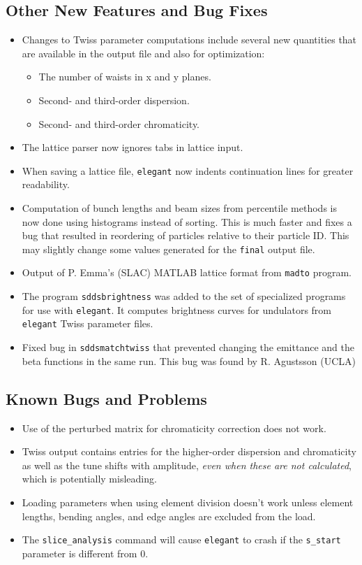 \documentclass[11pt]{article}
\begin{document}
\subsection{Other New Features and Bug Fixes}
\begin{itemize}
\item Changes to Twiss parameter computations include several new quantities
	that are available in the output file and also for optimization:
	\begin{itemize}
	\item The number of waists in x and y planes.
	\item Second- and third-order dispersion.
	\item Second- and third-order chromaticity.
	\end{itemize}
\item The lattice parser now ignores tabs in lattice input. 
\item When saving a lattice file, {\tt elegant} now indents continuation lines 
	for greater readability.
\item Computation of bunch lengths and beam sizes from percentile methods is
	now done using histograms instead of sorting.  This is much faster
	and fixes a bug that resulted in reordering of particles relative to
	their particle ID.  This may slightly change some values generated for
	the \verb|final| output file.
\item Output of P. Emma's (SLAC) MATLAB lattice format from {\tt madto} program.
\item The program {\tt sddsbrightness} was added to the set of specialized
	programs for use with {\tt elegant}.  It computes brightness curves
	for undulators from {\tt elegant} Twiss parameter files.
\item Fixed bug in {\tt sddsmatchtwiss} that prevented changing the emittance
	and the beta functions in the same run.  This bug was found by
	R. Agustsson (UCLA)
\end{itemize}

\subsection{Known Bugs and Problems}
\begin{itemize}
\item Use of the perturbed matrix for chromaticity correction does not work.
\item Twiss output contains entries for the higher-order dispersion and
	chromaticity as well as the tune shifts with amplitude, 
	{\em even when these are not calculated}, which is potentially
	misleading. 
\item Loading parameters when using element division doesn't work unless 
	element lengths, bending angles, and edge angles are excluded from
	the load.
\item The \verb|slice_analysis| command will cause \verb|elegant| to crash
	if the \verb|s_start| parameter is different from 0.
\end{itemize}
\end{document}
